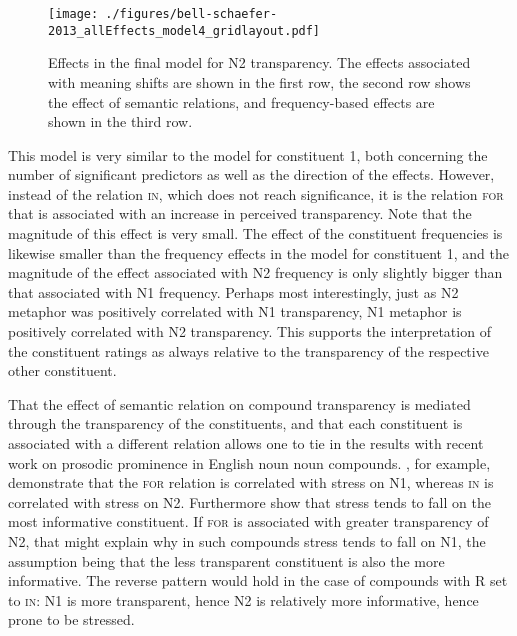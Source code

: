 \begin{figure}[!htb]
  \centering
\texttt{[image: ./figures/bell-schaefer-2013\_allEffects\_model4\_gridlayout.pdf]}
  
  \caption{Effects in the final model for N2 transparency. The effects associated with meaning
    shifts are shown in the first row, the second row shows the effect
    of semantic relations, and frequency-based
  effects  are shown in the third row.}
\label{fig:bellschaefer2013_model_4}
\end{figure}


This model is very similar to the model
for constituent 1, both concerning the number of significant
predictors as well as the direction of the effects. However, instead of the relation \textsc{in}, which
does not reach significance, it is
the relation \textsc{for} that is associated with an increase in
perceived transparency. Note that the magnitude of this effect is very
small. The effect of the constituent frequencies is likewise smaller
than the frequency effects in the model for constituent 1, and
the magnitude of the effect associated with N2 frequency is only
slightly bigger than that associated with N1 frequency. Perhaps most
interestingly, just as N2 metaphor was positively correlated with N1
transparency, N1 metaphor is positively correlated with N2
transparency. This supports the interpretation of the
constituent ratings as always relative to the transparency of the
respective other constituent.

That the effect of semantic relation on
compound transparency is mediated through the transparency of the
constituents, and that each constituent is associated with a different
relation allows one to tie in the results with recent work on
prosodic prominence in English noun noun compounds. \citet{Plagetal:2008}, for example, demonstrate that the \textsc{for} relation is correlated with stress on N1, whereas \textsc{in} is correlated with stress on N2. Furthermore \citet{BellandPlag:2012} show that stress tends to fall on the most informative constituent. If \textsc{for} is associated with greater transparency of N2, that might explain why in such compounds stress tends to fall on N1, the assumption being that the less transparent constituent is also the more informative. The reverse pattern would hold in the case of compounds with R set to \textsc{in}: N1 is more transparent, hence N2 is relatively more informative, hence prone to be stressed.

